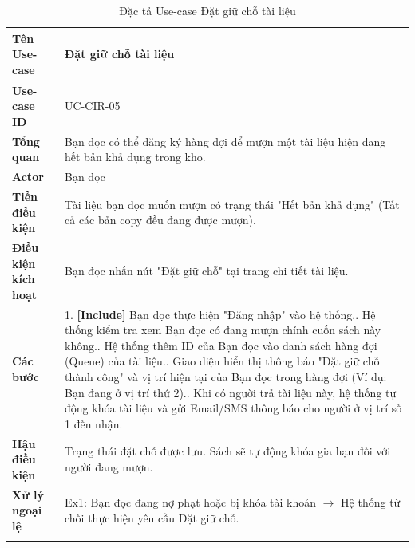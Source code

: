 \begin{longtable}{|p{3.5cm}|p{11.5cm}|}
    \hline
    \textbf{Tên Use-case} & \textbf{Đặt giữ chỗ tài liệu} \\
    \hline
    \textbf{Use-case ID} & UC-CIR-05 \\
    \hline
    \textbf{Tổng quan} & Bạn đọc có thể đăng ký hàng đợi để mượn một tài liệu hiện đang hết bản khả dụng trong kho. \\
    \hline
    \textbf{Actor} & Bạn đọc \\
    \hline
    \textbf{Tiền điều kiện} & Tài liệu bạn đọc muốn mượn có trạng thái "Hết bản khả dụng" (Tất cả các bản copy đều đang được mượn). \\
    \hline
    \textbf{Điều kiện kích hoạt} & Bạn đọc nhấn nút "Đặt giữ chỗ" tại trang chi tiết tài liệu. \\
    \hline
    \textbf{Các bước} & 
    1. \textbf{[Include]} Bạn đọc thực hiện "Đăng nhập" vào hệ thống.\newline
    2. Hệ thống kiểm tra xem Bạn đọc có đang mượn chính cuốn sách này không.\newline
    3. Hệ thống thêm ID của Bạn đọc vào danh sách hàng đợi (Queue) của tài liệu.\newline
    4. Giao diện hiển thị thông báo "Đặt giữ chỗ thành công" và vị trí hiện tại của Bạn đọc trong hàng đợi (Ví dụ: Bạn đang ở vị trí thứ 2).\newline
    5. Khi có người trả tài liệu này, hệ thống tự động khóa tài liệu và gửi Email/SMS thông báo cho người ở vị trí số 1 đến nhận. \\
    \hline
    \textbf{Hậu điều kiện} & Trạng thái đặt chỗ được lưu. Sách sẽ tự động khóa gia hạn đối với người đang mượn. \\
    \hline
    \textbf{Xử lý ngoại lệ} & 
    Ex1: Bạn đọc đang nợ phạt hoặc bị khóa tài khoản $\rightarrow$ Hệ thống từ chối thực hiện yêu cầu Đặt giữ chỗ. \\
    \hline
    \caption{Đặc tả Use-case Đặt giữ chỗ tài liệu}
\end{longtable}

